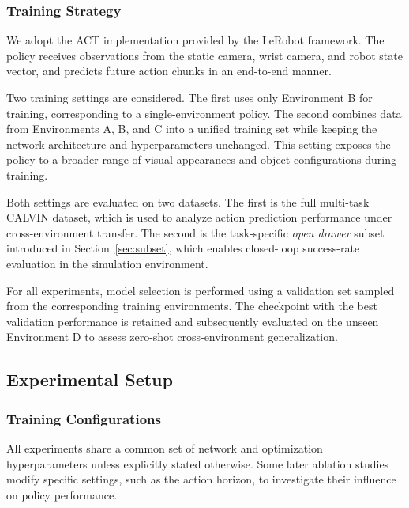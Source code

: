\subsubsection{Training Strategy}

We adopt the ACT implementation provided by the LeRobot framework. The policy receives observations from the static camera, wrist camera, and robot state vector, and predicts future action chunks in an end-to-end manner.

Two training settings are considered. The first uses only Environment B for training, corresponding to a single-environment policy. The second combines data from Environments A, B, and C into a unified training set while keeping the network architecture and hyperparameters unchanged. This setting exposes the policy to a broader range of visual appearances and object configurations during training.

Both settings are evaluated on two datasets. The first is the full multi-task CALVIN dataset, which is used to analyze action prediction performance under cross-environment transfer. The second is the task-specific \textit{open drawer} subset introduced in Section~\ref{sec:subset}, which enables closed-loop success-rate evaluation in the simulation environment.

For all experiments, model selection is performed using a validation set sampled from the corresponding training environments. The checkpoint with the best validation performance is retained and subsequently evaluated on the unseen Environment D to assess zero-shot cross-environment generalization.

\subsection{Experimental Setup}

\subsubsection{Training Configurations}

All experiments share a common set of network and optimization hyperparameters unless explicitly stated otherwise. Some later ablation studies modify specific settings, such as the action horizon, to investigate their influence on policy performance.

